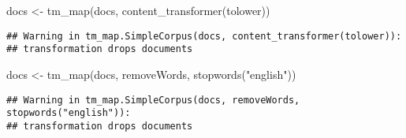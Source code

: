 \documentclass[
]{article}
\newenvironment{Shaded}{\begin{snugshade}}{\end{snugshade}}
\newcommand{\FunctionTok}[1]{\textcolor[rgb]{0.00,0.00,0.00}{#1}}
\newcommand{\NormalTok}[1]{#1}
\newcommand{\OtherTok}[1]{\textcolor[rgb]{0.56,0.35,0.01}{#1}}
\newcommand{\StringTok}[1]{\textcolor[rgb]{0.31,0.60,0.02}{#1}}
\begin{document}
\begin{Shaded}
\begin{Highlighting}[]
\NormalTok{docs }\OtherTok{\textless{}{-}} \FunctionTok{tm\_map}\NormalTok{(docs, }\FunctionTok{content\_transformer}\NormalTok{(tolower))}
\end{Highlighting}
\end{Shaded}

\begin{verbatim}
## Warning in tm_map.SimpleCorpus(docs, content_transformer(tolower)):
## transformation drops documents
\end{verbatim}

\begin{Shaded}
\begin{Highlighting}[]
\NormalTok{docs }\OtherTok{\textless{}{-}} \FunctionTok{tm\_map}\NormalTok{(docs, removeWords, }\FunctionTok{stopwords}\NormalTok{(}\StringTok{"english"}\NormalTok{))}
\end{Highlighting}
\end{Shaded}

\begin{verbatim}
## Warning in tm_map.SimpleCorpus(docs, removeWords, stopwords("english")):
## transformation drops documents
\end{verbatim}
\end{document}
